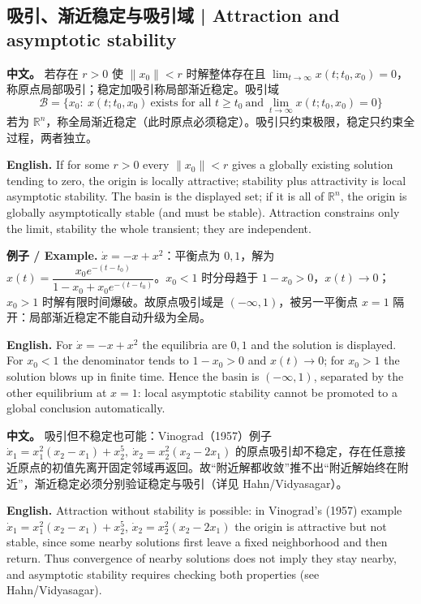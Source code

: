 \documentclass[UTF8,11pt,a4paper]{ctexart}
\newcommand{\EN}[1]{\par\noindent\textbf{English.} #1\par}
\newcommand{\EX}[2]{\par\noindent\textbf{例子 / Example.} #1\par\EN{#2}}
\newcommand{\APS}[2]{\par\noindent\textbf{中文。} #1\par\noindent\textbf{English.} #2\par}
\newcommand{\R}{\mathbb{R}}\newcommand{\N}{\mathbb{N}}
\newcommand{\norm}[1]{\lVert #1\rVert}\newcommand{\abs}[1]{\lvert #1\rvert}
\begin{document}
\subsection{吸引、渐近稳定与吸引域 | Attraction and asymptotic stability}
\APS{若存在 $r>0$ 使 $\norm{x_0}<r$ 时解整体存在且 $\lim_{t\to\infty}x(t;t_0,x_0)=0$，称原点局部吸引；稳定加吸引称局部渐近稳定。吸引域
\[
\mathcal B=\{x_0:\ x(t;t_0,x_0)\ \text{exists for all }t\ge t_0\ \text{and}\ \lim_{t\to\infty}x(t;t_0,x_0)=0\}
\]
若为 $\R^n$，称全局渐近稳定（此时原点必须稳定）。吸引只约束极限，稳定只约束全过程，两者独立。}{If for some $r>0$ every $\norm{x_0}<r$ gives a globally existing solution tending to zero, the origin is locally attractive; stability plus attractivity is local asymptotic stability. The basin is the displayed set; if it is all of $\R^n$, the origin is globally asymptotically stable (and must be stable). Attraction constrains only the limit, stability the whole transient; they are independent.}

\EX{$\dot x=-x+x^2$：平衡点为 $0,1$，解为 $x(t)=\dfrac{x_0e^{-(t-t_0)}}{1-x_0+x_0e^{-(t-t_0)}}$。$x_0<1$ 时分母趋于 $1-x_0>0$，$x(t)\to0$；$x_0>1$ 时解有限时间爆破。故原点吸引域是 $(-\infty,1)$，被另一平衡点 $x=1$ 隔开：局部渐近稳定不能自动升级为全局。}{For $\dot x=-x+x^2$ the equilibria are $0,1$ and the solution is displayed. For $x_0<1$ the denominator tends to $1-x_0>0$ and $x(t)\to0$; for $x_0>1$ the solution blows up in finite time. Hence the basin is $(-\infty,1)$, separated by the other equilibrium at $x=1$: local asymptotic stability cannot be promoted to a global conclusion automatically.}

\APS{吸引但不稳定也可能：Vinograd（1957）例子 $\dot x_1=x_1^2(x_2-x_1)+x_2^5,\ \dot x_2=x_2^2(x_2-2x_1)$ 的原点吸引却不稳定，存在任意接近原点的初值先离开固定邻域再返回。故“附近解都收敛”推不出“附近解始终在附近”，渐近稳定必须分别验证稳定与吸引（详见 Hahn/Vidyasagar）。}{Attraction without stability is possible: in Vinograd's (1957) example $\dot x_1=x_1^2(x_2-x_1)+x_2^5$, $\dot x_2=x_2^2(x_2-2x_1)$ the origin is attractive but not stable, since some nearby solutions first leave a fixed neighborhood and then return. Thus convergence of nearby solutions does not imply they stay nearby, and asymptotic stability requires checking both properties (see Hahn/Vidyasagar).}
\end{document}
